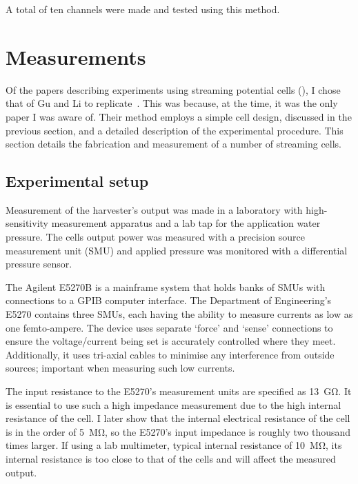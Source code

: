       A total of ten channels were made and tested using this method.


\section{Measurements}

Of the papers describing experiments using streaming potential cells (\cite{Gu2000,Mala1997,Scales1992,VanderHeyden2006}), I chose that of Gu and Li to replicate~\cite{Gu2000}.
This was because, at the time, it was the only paper I was aware of.
Their method employs a simple cell design, discussed in the previous section, and a detailed description of the experimental procedure.
This section details the fabrication and measurement of a number of streaming cells.

\subsection{\label{sub:Experimental-Procedure}Experimental setup}

    Measurement of the harvester's output was made in a laboratory with high-sensitivity measurement apparatus and a lab tap for the application water pressure.
    The cells output power was measured with a precision source measurement unit (SMU) and applied pressure was monitored with a differential pressure sensor.

    The Agilent E5270B is a mainframe system that holds banks of SMUs with connections to a GPIB computer interface.
    The Department of Engineering's E5270 contains three SMUs, each having the ability to measure currents as low as one femto-ampere.
    The device uses separate `force' and `sense' connections to ensure the voltage/current being set is accurately controlled where they meet.
    Additionally, it uses tri-axial cables to minimise any interference from outside sources; important when measuring such low currents.

    The input resistance to the E5270's measurement units are specified as \SI{13}{\giga\ohm}.
    It is essential to use such a high impedance measurement due to the high internal resistance of the cell.
    I later show that the internal electrical resistance of the cell is in the order of \SI{5}{\mega\ohm}, so the E5270's input impedance is roughly two thousand times larger.
    If using a lab multimeter, typical internal resistance of \SI{10}{\mega\ohm}, its internal resistance is too close to that of the cells and will affect the measured output.

